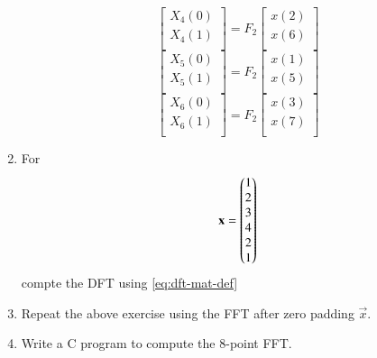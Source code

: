 \documentclass[journal,12pt,twocolumn]{IEEEtran}
\renewcommand\thesection{\arabic{section}}
\begin{document}
\begin{enumerate}[label=\arabic*.,ref=\thesection.\theenumi]
\begin{equation}
\end{equation}
\begin{equation}
\begin{bmatrix}
X_{4}(0) \\ 
X_{4}(1)\\ 
\end{bmatrix}
= F_{2}
\begin{bmatrix}
x(2) \\ 
x(6) \\ 
\end{bmatrix}
\end{equation}
\begin{equation}
\begin{bmatrix}
X_{5}(0) \\ 
X_{5}(1)\\ 
\end{bmatrix}
= F_{2}
\begin{bmatrix}
x(1) \\ 
x(5) \\ 
\end{bmatrix}
\end{equation}
\begin{equation}
\begin{bmatrix}
X_{6}(0) \\ 
X_{6}(1)\\ 
\end{bmatrix}
= F_{2}
\begin{bmatrix}
x(3) \\ 
x(7) \\ 
\end{bmatrix}
\end{equation}
\item For 
    \begin{align}
	    \mathbf{x} = \begin{pmatrix}1\\2\\3\\4\\2\\1\end{pmatrix}
        \label{eq:equation1}
    \end{align}
    compte the DFT  
		using 
	    \eqref{eq:dft-mat-def}
    \item Repeat the above exercise using the FFT
	    after zero padding $\vec{x}$.
\item Write a C program to compute the 8-point FFT. 
 \end{enumerate}
\end{document}
